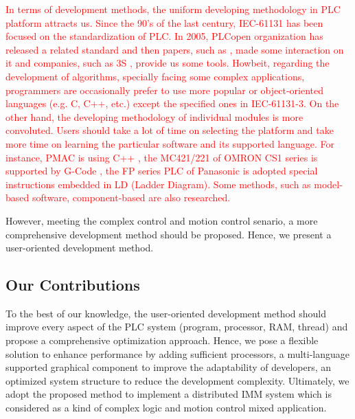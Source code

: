 \documentclass[journal,UTF8]{IEEEtran}
\begin{document}
\textcolor{red}{In terms of development methods, the uniform developing methodology in PLC platform attracts us. Since the 90's of the last century, IEC-61131 has been focused on the standardization of PLC\cite{IEC1993Programmable}. In 2005, PLCopen organization has released a  related standard \cite{PLCopen2005Function} and then papers, such as \cite{S2006Advanced}, made some interaction on it and companies, such as 3S \cite{3S2017Logic}, provide us some tools. Howbeit, regarding the development of algorithms, specially facing some complex applications, programmers are occasionally prefer to use more popular or object-oriented languages (e.g. C, C++, etc.)\cite{Bonfe2001Object, Werner2009Object, Basile2013On} except the specified ones in IEC-61131-3. On the other hand, the developing methodology of individual modules is more convoluted. Users should take a lot of time on selecting the platform and take more time on learning the particular software and its supported language. For instance, PMAC is using C++ \cite{Peng2011Linear,Qian2014A}, the MC421/221 of OMRON CS1 series is supported by G-Code \cite{OMRON2006CS1W}, the FP series PLC of Panasonic is adopted special instructions embedded in LD (Ladder Diagram). Some methods, such as model-based software, component-based \cite{Bonf2013Design, Vyatkin2013Software} are also researched.} 

However, meeting the complex control and motion control senario, a more comprehensive development method should be proposed. Hence, we present a user-oriented development method.

\subsection{Our Contributions}
To the best of our knowledge, the user-oriented development method should improve every aspect of the PLC system (program, processor, RAM, thread) and propose a comprehensive optimization approach. Hence, we pose a flexible solution to enhance performance by adding sufficient processors, a multi-language supported graphical component to improve the adaptability of developers, an optimized system structure to reduce the development complexity. Ultimately, we adopt the proposed method to implement a distributed IMM system which is considered as a kind of complex logic and motion control mixed application. 
\end{document}
